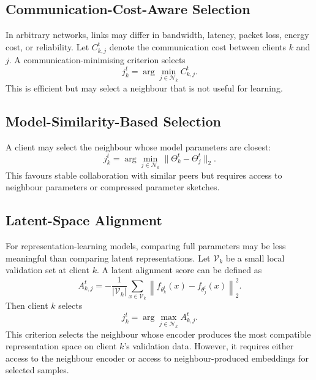 \documentclass[conference]{IEEEtran}
\begin{document}
\subsection{Communication-Cost-Aware Selection}
\label{subsec:communication-cost-aware-selection}
In arbitrary networks, links may differ in bandwidth, latency, packet loss, energy cost, or reliability. Let \(C_{k,j}^t\) denote the communication cost between clients \(k\) and \(j\). A communication-minimising criterion selects
\begin{equation}
    j_k^t = \arg\min_{j\in\mathcal{N}_k} C_{k,j}^t.
    \label{eq:auto-020}
\end{equation}
This is efficient but may select a neighbour that is not useful for learning.

\subsection{Model-Similarity-Based Selection}
\label{subsec:model-similarity-based-selection}
A client may select the neighbour whose model parameters are closest:
\begin{equation}
    j_k^t
    =
    \arg\min_{j\in\mathcal{N}_k}
    \|\Theta_k^t-\Theta_j^t\|_2.
    \label{eq:auto-021}
\end{equation}
This favours stable collaboration with similar peers but requires access to neighbour parameters or compressed parameter sketches.

\subsection{Latent-Space Alignment}
\label{subsec:latent-space-alignment}
For representation-learning models, comparing full parameters may be less meaningful than comparing latent representations. Let \(\mathcal{V}_k\) be a small local validation set at client \(k\). A latent alignment score can be defined as
\begin{equation}
    A_{k,j}^{t}
    =
    -\frac{1}{|\mathcal{V}_k|}
    \sum_{x\in\mathcal{V}_k}
    \left\|
    f_{\theta_k^t}(x)-f_{\theta_j^t}(x)
    \right\|_2^2.
    \label{eq:auto-022}
\end{equation}
Then client \(k\) selects
\begin{equation}
    j_k^t = \arg\max_{j\in\mathcal{N}_k} A_{k,j}^{t}.
    \label{eq:auto-023}
\end{equation}
This criterion selects the neighbour whose encoder produces the most compatible representation space on client \(k\)'s validation data. However, it requires either access to the neighbour encoder or access to neighbour-produced embeddings for selected samples.
\end{document}
